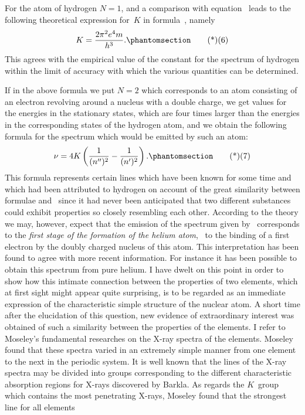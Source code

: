 For the atom of hydrogen $N = 1$, and a comparison with
equation~ leads to the following theoretical expression for~$K$ in
formula~, namely
\[
K = \frac{2\pi^{2} e^{4} m}{h^{3}}.
\Tag{(6)}
\]
This agrees with the empirical value of the constant for the spectrum
of hydrogen within the limit of accuracy with which the various
quantities can be determined.

 If in the above
formula we put $N = 2$ which corresponds to an atom consisting of
an electron revolving around a nucleus with a double charge, we
get values for the energies in the stationary states, which are four
times larger than the energies in the corresponding states of the
hydrogen atom, and we obtain the following formula for the
spectrum which would be emitted by such an atom:
\[
\nu = 4K \left(\frac{1}{(n'')^{2}} - \frac{1}{(n')^{2}}\right).
\Tag{(7)}
\]
This formula represents certain lines which have been known for
some time and which had been attributed to hydrogen on account
of the great similarity between formulae  and~ since it had
never been anticipated that two different substances could exhibit
properties so closely resembling each other. According to the theory
we may, however, expect that the emission of the spectrum given by~
corresponds to the \emph{first stage of the formation of the helium atom},
\ie\ to the binding of a first electron by the doubly charged nucleus
of this atom. This interpretation has been found to agree with
more recent information. For instance it has been possible to
obtain this spectrum from pure helium. I have dwelt on this point
in order to show how this intimate connection between the properties
of two elements, which at first sight might appear quite
surprising, is to be regarded as an immediate expression of the
characteristic simple structure of the nuclear atom. A short time
after the elucidation of this question, new evidence of extraordinary
interest was obtained of such a similarity between the properties of
the elements. I refer to Moseley's fundamental researches on the
X-ray spectra of the elements. Moseley found that these spectra
varied in an extremely simple manner from one element to the
next in the periodic system. It is well known that the lines of
the X-ray spectra may be divided into groups corresponding to the
different characteristic absorption regions for X-rays discovered by
Barkla. As regards the $K$~group which contains the most penetrating
X-rays, Moseley found that the strongest line for all elements
